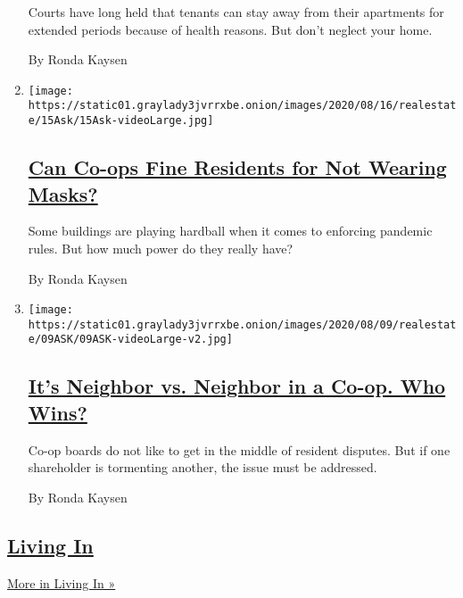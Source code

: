 \begin{enumerate}
  Courts have long held that tenants can stay away from their apartments
  for extended periods because of health reasons. But don't neglect your
  home.

  By Ronda Kaysen
\item
  \texttt{[image: https://static01.graylady3jvrrxbe.onion/images/2020/08/16/realestate/15Ask/15Ask-videoLarge.jpg]}

  \hypertarget{can-co-ops-fine-residents-for-not-wearing-masks}{%
  \subsection{\texorpdfstring{\href{/2020/08/15/realestate/coop-fine-face-mask.html}{Can
  Co-ops Fine Residents for Not Wearing
  Masks?}}{Can Co-ops Fine Residents for Not Wearing Masks?}}\label{can-co-ops-fine-residents-for-not-wearing-masks}}

  Some buildings are playing hardball when it comes to enforcing
  pandemic rules. But how much power do they really have?

  By Ronda Kaysen
\item
  \texttt{[image: https://static01.graylady3jvrrxbe.onion/images/2020/08/09/realestate/09ASK/09ASK-videoLarge-v2.jpg]}

  \hypertarget{its-neighbor-vs-neighbor-in-a-co-op-who-wins}{%
  \subsection{\texorpdfstring{\href{/2020/08/08/realestate/neighbor-complaints-co-ops.html}{It's
  Neighbor vs. Neighbor in a Co-op. Who
  Wins?}}{It's Neighbor vs. Neighbor in a Co-op. Who Wins?}}\label{its-neighbor-vs-neighbor-in-a-co-op-who-wins}}

  Co-op boards do not like to get in the middle of resident disputes.
  But if one shareholder is tormenting another, the issue must be
  addressed.

  By Ronda Kaysen
\end{enumerate}

\hypertarget{living-in-1}{%
\subsection{\texorpdfstring{\href{/column/living-in}{Living
In}}{Living In}}\label{living-in-1}}

\href{/column/living-in}{More in Living In »}

